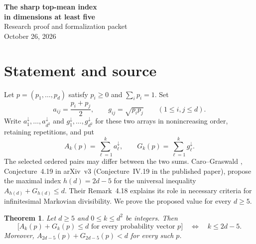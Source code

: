 \documentclass[11pt]{article}
\newtheorem{theorem}{Theorem}
\begin{document}
\begin{center}
{\Large\bfseries The sharp top-mean index\\in dimensions at least five}\\[.5em]
Research proof and formalization packet\\
October 26, 2026
\end{center}
\begin{abstract}
For a probability vector in dimension $d$, form all $d^2$ arithmetic
means and all $d^2$ geometric means of its ordered coordinate pairs.
Sort the two arrays independently. We prove that, for every $d\ge5$,
the sum of their respective largest $k$ entries is at most $d$ for
every probability vector if and only if $k\le2d-5$.
This establishes the value proposed by Caro and Graswald in that
dimension range. The proof combines two incidence bounds for arbitrary
sets of ordered pairs with Cauchy--Schwarz. An explicit probability
vector proves sharpness in every dimension. The complete statement,
including the independently sorted arrays, is certified in Lean.
\end{abstract}

\section{Statement and source}
Let $p=(p_1,\ldots,p_d)$ satisfy $p_i\ge0$ and $\sum_i p_i=1$.
Set
\[
 a_{ij}=\frac{p_i+p_j}{2},\qquad g_{ij}=\sqrt{p_i p_j}
 \qquad(1\le i,j\le d).
\]
Write $a^\downarrow_1,\ldots,a^\downarrow_{d^2}$ and
$g^\downarrow_1,\ldots,g^\downarrow_{d^2}$ for these two arrays in
nonincreasing order, retaining repetitions, and put
\[
 A_k(p)=\sum_{\ell=1}^k a^\downarrow_\ell,
 \qquad G_k(p)=\sum_{\ell=1}^k g^\downarrow_\ell.
\]
The selected ordered pairs may differ between the two sums.
Caro--Graswald \cite{CG}, Conjecture~4.19 in arXiv~v3
(Conjecture~IV.19 in the published paper), propose the maximal index
$h(d)=2d-5$ for the universal inequality $A_{h(d)}+G_{h(d)}\le d$.
Their Remark~4.18 explains its role in necessary criteria for
infinitesimal Markovian divisibility. We prove the proposed value for
every $d\ge5$.

\begin{theorem}\label{main}
Let $d\ge5$ and $0\le k\le d^2$ be integers. Then
\[
 \bigl[A_k(p)+G_k(p)\le d\text{ for every probability vector }p\bigr]
 \quad\Longleftrightarrow\quad k\le2d-5.
\]
Moreover, $A_{2d-5}(p)+G_{2d-5}(p)<d$ for every such $p$.
\end{theorem}
\end{document}
